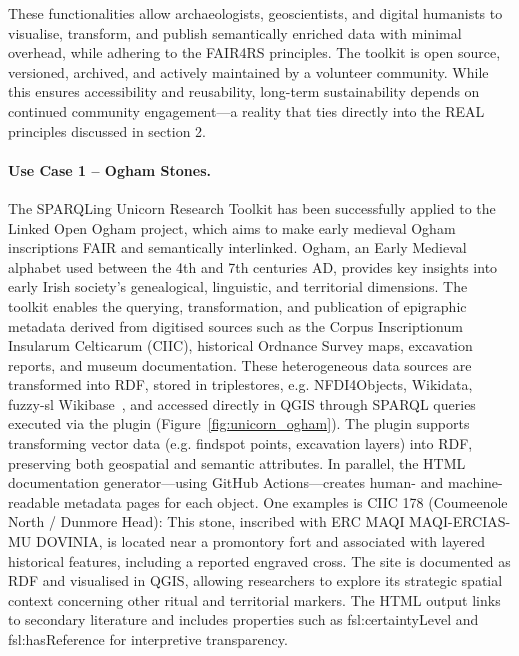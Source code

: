 \documentclass{eceasst}
\begin{document}
These functionalities allow archaeologists, geoscientists, and digital humanists to visualise, transform, and publish semantically enriched data with minimal overhead, while adhering to the FAIR4RS principles. The toolkit is open source, versioned, archived, and actively maintained by a volunteer community. While this ensures accessibility and reusability, long-term sustainability depends on continued community engagement—a reality that ties directly into the REAL principles discussed in section 2.

\paragraph{Use Case 1 – Ogham Stones.} The SPARQLing Unicorn Research Toolkit has been successfully applied to the Linked Open Ogham project, which aims to make early medieval Ogham inscriptions FAIR and semantically interlinked. Ogham, an Early Medieval alphabet used between the 4th and 7th centuries AD, provides key insights into early Irish society's genealogical, linguistic, and territorial dimensions. The toolkit enables the querying, transformation, and publication of epigraphic metadata derived from digitised sources such as the Corpus Inscriptionum Insularum Celticarum (CIIC), historical Ordnance Survey maps, excavation reports, and museum documentation. These heterogeneous data sources are transformed into RDF, stored in triplestores, e.g. NFDI4Objects, Wikidata, fuzzy-sl Wikibase~\cite{thiery_linked_2023}, and accessed directly in QGIS through SPARQL queries executed via the plugin (Figure~\ref{fig:unicorn_ogham}). The plugin supports transforming vector data (e.g. findspot points, excavation layers) into RDF, preserving both geospatial and semantic attributes. In parallel, the HTML documentation generator—using GitHub Actions—creates human- and machine-readable metadata pages for each object. One examples is CIIC 178 (Coumeenole North / Dunmore Head): This stone, inscribed with ERC MAQI MAQI-ERCIAS-MU DOVINIA, is located near a promontory fort and associated with layered historical features, including a reported engraved cross. The site is documented as RDF and visualised in QGIS, allowing researchers to explore its strategic spatial context concerning other ritual and territorial markers. The HTML output links to secondary literature and includes properties such as fsl:certaintyLevel and fsl:hasReference for interpretive transparency.
\end{document}
